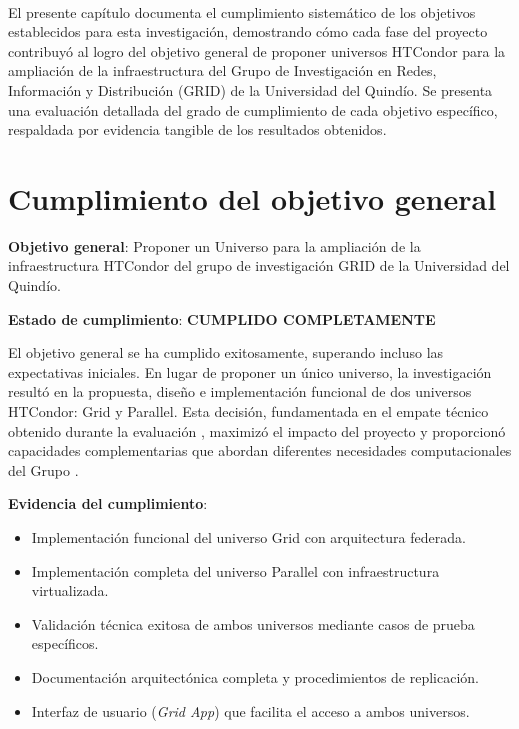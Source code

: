 \label{cap:cumplimiento-objetivos}
\mbox{}\\

El presente capítulo documenta el cumplimiento sistemático de los objetivos establecidos para esta investigación, demostrando cómo cada fase del proyecto contribuyó al logro del objetivo general de proponer universos HTCondor para la ampliación de la infraestructura del Grupo de Investigación en Redes, Información y Distribución (GRID) de la Universidad del Quindío. Se presenta una evaluación detallada del grado de cumplimiento de cada objetivo específico, respaldada por evidencia tangible de los resultados obtenidos.

\section{Cumplimiento del objetivo general}
\noindent

\textbf{Objetivo general}: Proponer un Universo para la ampliación de la infraestructura HTCondor del grupo de investigación GRID de la Universidad del Quindío.

\textbf{Estado de cumplimiento}: \textbf{CUMPLIDO COMPLETAMENTE}

El objetivo general se ha cumplido exitosamente, superando incluso las expectativas iniciales. En lugar de proponer un único universo, la investigación resultó en la propuesta, diseño e implementación funcional de dos universos HTCondor: Grid y Parallel. Esta decisión, fundamentada en el empate técnico obtenido durante la evaluación \DAR, maximizó el impacto del proyecto y proporcionó capacidades complementarias que abordan diferentes necesidades computacionales del Grupo \GRID.

\textbf{Evidencia del cumplimiento}:
\begin{itemize}
    \item Implementación funcional del universo Grid con arquitectura federada.
    \item Implementación completa del universo Parallel con infraestructura virtualizada.
    \item Validación técnica exitosa de ambos universos mediante casos de prueba específicos.
    \item Documentación arquitectónica completa y procedimientos de replicación.
    \item Interfaz de usuario (\textit{Grid App}) que facilita el acceso a ambos universos.
\end{itemize}

